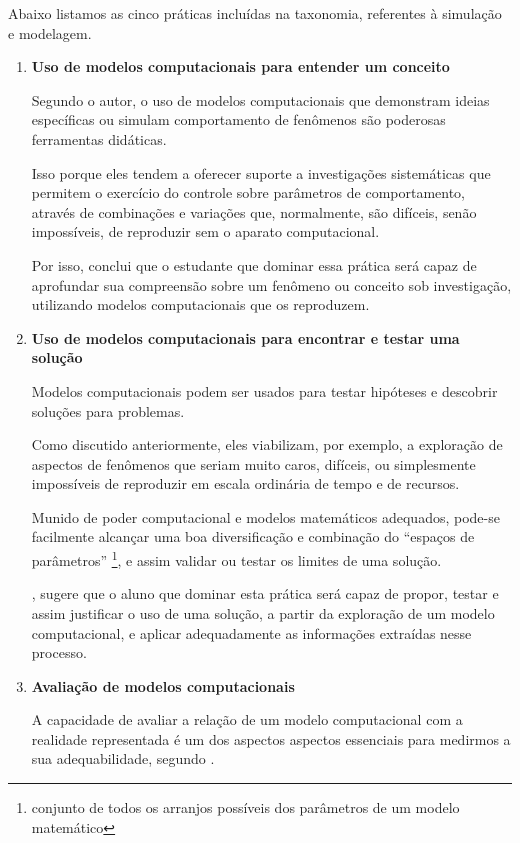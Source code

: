 Abaixo listamos as cinco práticas incluídas na taxonomia, referentes à simulação e modelagem.

\begin{enumerate}
  \item \textbf{Uso de modelos computacionais para entender um conceito}

  Segundo o autor, o uso de modelos computacionais que demonstram ideias específicas ou simulam comportamento de fenômenos são poderosas ferramentas didáticas.

  Isso porque eles tendem a oferecer suporte a investigações sistemáticas que permitem o exercício do controle sobre parâmetros de comportamento, através de combinações e variações que, normalmente, são difíceis, senão impossíveis, de reproduzir sem o aparato computacional.

  Por isso, conclui que o estudante que dominar essa prática será capaz de aprofundar sua compreensão sobre um fenômeno ou conceito sob investigação, utilizando modelos computacionais que os reproduzem.

  \item \textbf{Uso de modelos computacionais para encontrar e testar uma solução}
  
  Modelos computacionais podem ser usados para testar hipóteses e descobrir soluções para problemas. 

  Como discutido anteriormente, eles viabilizam, por exemplo, a exploração de aspectos de fenômenos que seriam muito caros, difíceis, ou simplesmente impossíveis de reproduzir em escala ordinária de tempo e de recursos.

  Munido de poder computacional e modelos matemáticos adequados, pode-se facilmente alcançar uma boa diversificação e combinação do ``espaços de parâmetros'' \footnote{conjunto de todos os arranjos possíveis dos parâmetros de um modelo matemático}, e assim validar ou testar os limites de uma solução.

  , sugere que o aluno que dominar esta prática será capaz de propor, testar e assim justificar o uso de uma solução, a partir da exploração de um modelo computacional, e aplicar adequadamente as informações extraídas nesse processo.

  \item \textbf{Avaliação de modelos computacionais}

  A capacidade de avaliar a relação de um modelo computacional com a realidade representada é um dos aspectos aspectos essenciais para medirmos a sua adequabilidade, segundo .


\end{enumerate}

